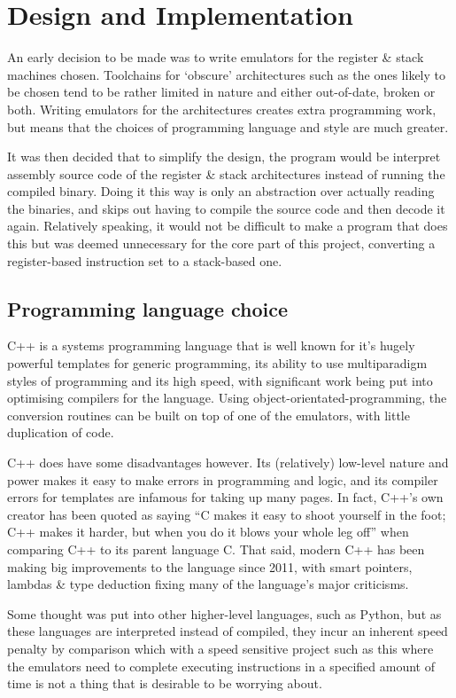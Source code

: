 \chapter{Design and Implementation}\label{ch:designimplementation}

An early decision to be made was to write emulators for the register \& stack
machines chosen. Toolchains for `obscure' architectures such as the ones likely
to be chosen tend to be rather limited in nature and either out-of-date, broken
or both. Writing emulators for the architectures creates extra programming
work, but means that the choices of programming language and style are much
greater.

It was then decided that to simplify the design, the program would be interpret
assembly source code of the register \& stack architectures instead of running
the compiled binary. Doing it this way is only an abstraction over actually
reading the binaries, and skips out having to compile the source code and then
decode it again. Relatively speaking, it would not be difficult to make a
program that does this but was deemed unnecessary for the core part of this
project, converting a register-based instruction set to a stack-based one.

\section{Programming language choice}
C++ is a systems programming language that is well known for it's hugely
powerful templates for generic programming, its ability to use multiparadigm
styles of programming and its high speed, with significant work being put into
optimising compilers for the language. Using object-orientated-programming, the
conversion routines can be built on top of one of the emulators, with little
duplication of code.

C++ does have some disadvantages however. Its (relatively) low-level nature and
power makes it easy to make errors in programming and logic, and its compiler
errors for templates are infamous for taking up many pages. In fact, C++'s own
creator has been quoted as saying ``C makes it easy to shoot yourself in the
foot; C++ makes it harder, but when you do it blows your whole leg off'' when
comparing C++ to its parent language C. That said, modern C++ has been making
big improvements to the language since 2011, with smart pointers, lambdas \&
type deduction fixing many of the language's major criticisms.

Some thought was put into other higher-level languages, such as Python, but as
these languages are interpreted instead of compiled, they incur an inherent
speed penalty by comparison which with a speed sensitive project such as this
where the emulators need to complete executing instructions in a specified
amount of time is not a thing that is desirable to be worrying about.

